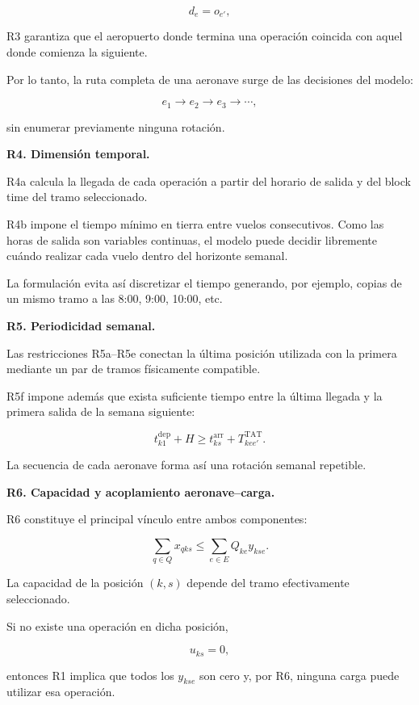 \[
d_e=o_{e'},
\]

R3 garantiza que el aeropuerto donde termina una operación coincida con aquel donde comienza
la siguiente.

Por lo tanto, la ruta completa de una aeronave surge de las decisiones del modelo:

\[
e_1\rightarrow e_2\rightarrow e_3\rightarrow\cdots,
\]

sin enumerar previamente ninguna rotación.


\vspace{0.5em}
\noindent\textbf{R4. Dimensión temporal.}

R4a calcula la llegada de cada operación a partir del horario de salida y del block time del
tramo seleccionado.

R4b impone el tiempo mínimo en tierra entre vuelos consecutivos. Como las horas de salida son
variables continuas, el modelo puede decidir libremente cuándo realizar cada vuelo dentro del
horizonte semanal.

La formulación evita así discretizar el tiempo generando, por ejemplo, copias de un mismo
tramo a las 8:00, 9:00, 10:00, etc.


\vspace{0.5em}
\noindent\textbf{R5. Periodicidad semanal.}

Las restricciones R5a--R5e conectan la última posición utilizada con la primera mediante un
par de tramos físicamente compatible.

R5f impone además que exista suficiente tiempo entre la última llegada y la primera salida
de la semana siguiente:

\[
t_{k1}^{\mathrm{dep}}+H
\geq
t_{ks}^{\mathrm{arr}}
+
T_{kee'}^{\mathrm{TAT}}.
\]

La secuencia de cada aeronave forma así una rotación semanal repetible.


\vspace{0.5em}
\noindent\textbf{R6. Capacidad y acoplamiento aeronave--carga.}

R6 constituye el principal vínculo entre ambos componentes:

\[
\sum_{q\in Q}x_{qks}
\leq
\sum_{e\in E}Q_{ke}y_{kse}.
\]

La capacidad de la posición $(k,s)$ depende del tramo efectivamente seleccionado.

Si no existe una operación en dicha posición,

\[
u_{ks}=0,
\]

entonces R1 implica que todos los $y_{kse}$ son cero y, por R6, ninguna carga puede utilizar
esa operación.


